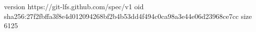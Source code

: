 version https://git-lfs.github.com/spec/v1
oid sha256:27f2fbffa3f8e4d012094268bf2b4b53dd4f494c0ca98a3e44e06d23968ce7cc
size 6125
